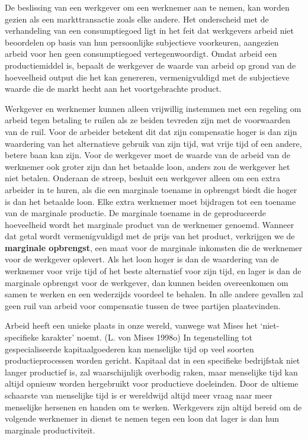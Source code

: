 \documentclass[
  a5paper,
  smalldemyvopaper,11pt,twoside,onecolumn,openright,extrafontsizes,
hidelinks]{memoir}
\begin{document}
De beslissing van een werkgever om een werknemer aan te nemen, kan
worden gezien als een markttransactie zoals elke andere. Het onderscheid
met de verhandeling van een consumptiegoed ligt in het feit dat
werkgevers arbeid niet beoordelen op basis van hun persoonlijke
subjectieve voorkeuren, aangezien arbeid voor hen geen consumptiegoed
vertegenwoordigt. Omdat arbeid een productiemiddel is, bepaalt de
werkgever de waarde van arbeid op grond van de hoeveelheid output die
het kan genereren, vermenigvuldigd met de subjectieve waarde die de
markt hecht aan het voortgebrachte product.

Werkgever en werknemer kunnen alleen vrijwillig instemmen met een
regeling om arbeid tegen betaling te ruilen als ze beiden tevreden zijn
met de voorwaarden van de ruil. Voor de arbeider betekent dit dat zijn
compensatie hoger is dan zijn waardering van het alternatieve gebruik
van zijn tijd, wat vrije tijd of een andere, betere baan kan zijn. Voor
de werkgever moet de waarde van de arbeid van de werknemer ook groter
zijn dan het betaalde loon, anders zou de werkgever het niet betalen.
Onderaan de streep, besluit een werkgever alleen om een extra arbeider
in te huren, als die een marginale toename in opbrengst biedt die hoger
is dan het betaalde loon. Elke extra werknemer moet bijdragen tot een
toename van de marginale productie. De marginale toename in de
geproduceerde hoeveelheid wordt het marginale product van de werknemer
genoemd. Wanneer dat getal wordt vermenigvuldigd met de prijs van het
product, verkrijgen we de \textbf{marginale opbrengst}, een maat voor de
marginale inkomsten die de werknemer voor de werkgever oplevert. Als het
loon hoger is dan de waardering van de werknemer voor vrije tijd of het
beste alternatief voor zijn tijd, en lager is dan de marginale opbrengst
voor de werkgever, dan kunnen beiden overeenkomen om samen te werken en
een wederzijds voordeel te behalen. In alle andere gevallen zal geen
ruil van arbeid voor compensatie tussen de twee partijen plaatsvinden.

Arbeid heeft een unieke plaats in onze wereld, vanwege wat Mises het
`niet-specifieke karakter' noemt. (L. von Mises 1998o) In tegenstelling
tot gespecialiseerde kapitaalgoederen kan menselijke tijd op veel
soorten productieprocessen worden gericht. Kapitaal dat in een
specifieke bedrijfstak niet langer productief is, zal waarschijnlijk
overbodig raken, maar menselijke tijd kan altijd opnieuw worden
hergebruikt voor productieve doeleinden. Door de ultieme schaarste van
menselijke tijd is er wereldwijd altijd meer vraag naar meer menselijke
hersenen en handen om te werken. Werkgevers zijn altijd bereid om de
volgende werknemer in dienst te nemen tegen een loon dat lager is dan
hun marginale productiviteit.
\end{document}
